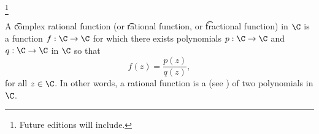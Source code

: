 
\footnote{Future editions will include.}


A \t{complex rational function} (or \t{rational function}, or \t{fractional function}) in $\C$ is a function $f: \C \to \C$ for which there exists
polynomials $p: \C \to \C$ and $q: \C \to \C$ in $\C$ so that
\[
    f(z) = \frac{p(z)}{q(z)},
\]
for all $z \in \C$.
In other words, a rational function is a  (see ) of two polynomials in $\C$.

\blankpage
